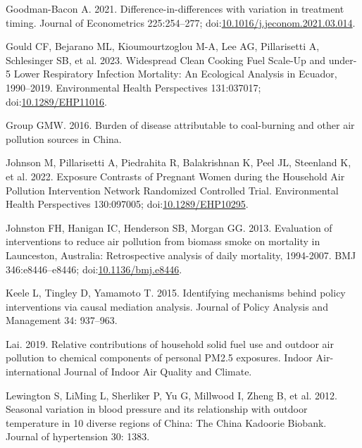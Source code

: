 \documentclass[
  letterpaper,
  DIV=11,
  numbers=noendperiod]{scrartcl}
\newlength{\cslhangindent}
\newlength{\cslentryspacingunit} %
\newenvironment{CSLReferences}[2] %
 {%
  \setlength{\parindent}{0pt}
  \ifodd #1
  \let\oldpar\par
  \def\par{\hangindent=\cslhangindent\oldpar}
  \fi
  \setlength{\parskip}{#2\cslentryspacingunit}
 }%
 {}
\begin{document}
\begin{CSLReferences}{1}{0}
\leavevmode{}%
Goodman-Bacon A. 2021. Difference-in-differences with variation in
treatment timing. Journal of Econometrics 225:254--277;
doi:\href{https://doi.org/10.1016/j.jeconom.2021.03.014}{10.1016/j.jeconom.2021.03.014}.

\leavevmode{}%
Gould CF, Bejarano ML, Kioumourtzoglou M-A, Lee AG, Pillarisetti A,
Schlesinger SB, et al. 2023. Widespread {Clean Cooking Fuel Scale-Up}
and under-5 {Lower Respiratory Infection Mortality}: {An Ecological
Analysis} in {Ecuador}, 1990--2019. Environmental Health Perspectives
131:037017;
doi:\href{https://doi.org/10.1289/EHP11016}{10.1289/EHP11016}.

\leavevmode{}%
Group GMW. 2016. Burden of disease attributable to coal-burning and
other air pollution sources in {China}.

\leavevmode{}%
Johnson M, Pillarisetti A, Piedrahita R, Balakrishnan K, Peel JL,
Steenland K, et al. 2022. Exposure {Contrasts} of {Pregnant Women}
during the {Household Air Pollution Intervention Network Randomized
Controlled Trial}. Environmental Health Perspectives 130:097005;
doi:\href{https://doi.org/10.1289/EHP10295}{10.1289/EHP10295}.

\leavevmode{}%
Johnston FH, Hanigan IC, Henderson SB, Morgan GG. 2013. Evaluation of
interventions to reduce air pollution from biomass smoke on mortality in
{Launceston}, {Australia}: Retrospective analysis of daily mortality,
1994-2007. BMJ 346:e8446--e8446;
doi:\href{https://doi.org/10.1136/bmj.e8446}{10.1136/bmj.e8446}.

\leavevmode{}%
Keele L, Tingley D, Yamamoto T. 2015. Identifying mechanisms behind
policy interventions via causal mediation analysis. Journal of Policy
Analysis and Management 34: 937--963.

\leavevmode{}%
Lai. 2019. Relative contributions of household solid fuel use and
outdoor air pollution to chemical components of personal {PM2}.5
exposures. Indoor Air-international Journal of Indoor Air Quality and
Climate.

\leavevmode{}%
Lewington S, LiMing L, Sherliker P, Yu G, Millwood I, Zheng B, et al.
2012. Seasonal variation in blood pressure and its relationship with
outdoor temperature in 10 diverse regions of {China}: The {China
Kadoorie Biobank}. Journal of hypertension 30: 1383.


\end{CSLReferences}
\end{document}
